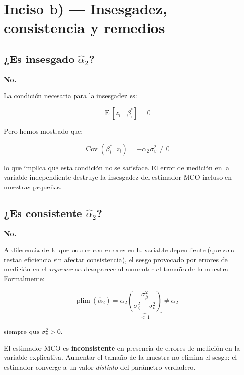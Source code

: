 \documentclass[12pt,letterpaper]{article}
\newcommand{\Cov}{\operatorname{Cov}}
\newcommand{\E}{\operatorname{E}}
\newcommand{\plim}{\operatorname{plim}}
\begin{document}
\section{Inciso b) --- Insesgadez, consistencia y remedios}

\subsection{¿Es insesgado $\hat{\alpha}_{2}$?}

\textbf{No.}

La condición necesaria para la insesgadez es:

\begin{equation}
\E[z_{i} \mid \beta_{i}^{*}] = 0
\end{equation}

Pero hemos mostrado que:

\begin{equation}
\Cov(\beta_{i}^{*},\, z_{i}) = -\alpha_{2}\,\sigma_{v}^{2} \neq 0
\end{equation}

lo que implica que esta condición no se satisface. El error de medición
en la variable independiente destruye la insesgadez del estimador MCO
incluso en muestras pequeñas.

\subsection{¿Es consistente $\hat{\alpha}_{2}$?}

\textbf{No.}

A diferencia de lo que ocurre con errores en la variable dependiente
(que solo restan eficiencia sin afectar consistencia), el sesgo
provocado por errores de medición en el \emph{regresor} no desaparece
al aumentar el tamaño de la muestra. Formalmente:

\begin{equation}
\plim(\hat{\alpha}_{2})
= \alpha_{2}
  \underbrace{
    \left(
      \frac{\sigma_{\beta}^{2}}{\sigma_{\beta}^{2} + \sigma_{v}^{2}}
    \right)
  }_{<\,1}
  \neq \alpha_{2}
\end{equation}

siempre que $\sigma_{v}^{2} > 0$.

\begin{clave}

El estimador MCO es \textbf{inconsistente} en presencia de errores de
medición en la variable explicativa. Aumentar el tamaño de la muestra
no elimina el sesgo: el estimador converge a un valor
\emph{distinto} del parámetro verdadero.

\end{clave}
\end{document}
